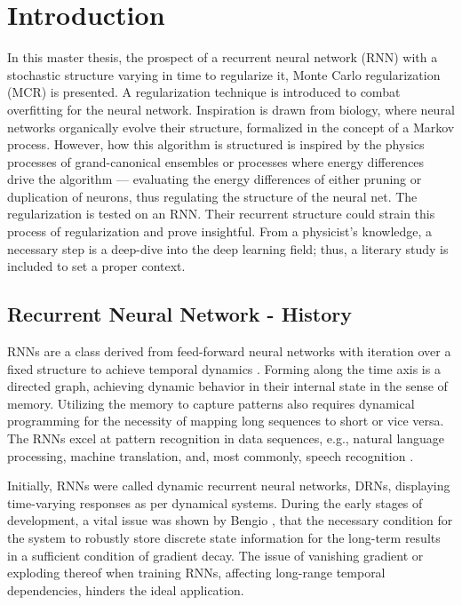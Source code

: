 
\chapter{Introduction}

In this master thesis, the prospect of a recurrent neural network (RNN) with a stochastic structure varying in time to regularize it, Monte Carlo regularization (MCR) is presented. A regularization technique is introduced to combat overfitting for the neural network. Inspiration is drawn from biology, where neural networks organically evolve their structure, formalized in the concept of a Markov process. However, how this algorithm is structured is inspired by the physics processes of grand-canonical ensembles or processes where energy differences drive the algorithm — evaluating the energy differences of either pruning or duplication of neurons, thus regulating the structure of the neural net. The regularization is tested on an RNN. Their recurrent structure could strain this process of regularization and prove insightful. From a physicist's knowledge, a necessary step is a deep-dive into the deep learning field; thus, a literary study is included to set a proper context.

\section{Recurrent Neural Network - History}

RNNs are a class derived from feed-forward neural networks with iteration over a fixed structure to achieve temporal dynamics \cite{DRNNS}. Forming along the time axis is a directed graph, achieving dynamic behavior in their internal state in the sense of memory. Utilizing the memory to capture patterns also requires dynamical programming for the necessity of mapping long sequences to short or vice versa. The RNNs excel at pattern recognition in data sequences, e.g., natural language processing, machine translation, and, most commonly, speech recognition \cite{handwriting}. 

Initially, RNNs were called dynamic recurrent neural networks, DRNs, displaying time-varying responses as per dynamical systems. During the early stages of development, a vital issue was shown by Bengio \cite{ben}, that the necessary condition for the system to robustly store discrete state information for the long-term results in a sufficient condition of gradient decay. The issue of vanishing gradient \cite{hoch} or exploding thereof when training RNNs, affecting long-range temporal dependencies, hinders the ideal application. 

